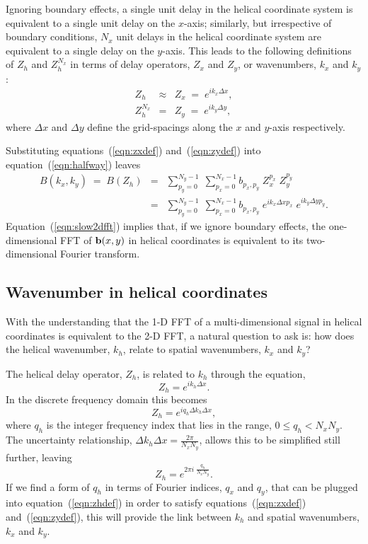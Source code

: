\par
Ignoring boundary effects, a single unit delay in the helical
coordinate system is equivalent to a single unit delay on the
$x$-axis;  
similarly, but irrespective of boundary conditions, $N_x$ unit delays
in the helical coordinate system are equivalent to a single delay on
the $y$-axis.   
This leads to the following definitions of $Z_h$ and
$Z_h^{N_x}$ in terms of delay operators, $Z_x$ and $Z_y$, or
wavenumbers, $k_x$ and $k_y$:
\begin{eqnarray}
Z_h    & \approx &  Z_x \; = \; e^{i k_x \Delta x}, 
\label{eqn:zxdef} \\ 
Z_h^{N_x} & = &  Z_y \; = \; e^{i k_y \Delta y}, \label{eqn:zydef}
\end{eqnarray}
where $\Delta x$ and $\Delta y$ define the grid-spacings along the $x$
and $y$-axis respectively.

\par
Substituting equations~(\ref{eqn:zxdef}) and~(\ref{eqn:zydef}) into
equation~(\ref{eqn:halfway}) leaves 
\begin{eqnarray}
B(k_x,k_y) \; = \; B(Z_h) 
& = & \sum_{p_y=0}^{N_y-1} \; \sum_{p_x=0}^{N_x-1}
b_{p_x,p_y} \; Z_x^{p_x} \; Z_y^{p_y} \\
& = & \sum_{p_y=0}^{N_y-1} \; \sum_{p_x=0}^{N_x-1}
b_{p_x,p_y} \; e^{i k_x \Delta x p_x} \; 
e^{i k_y \Delta y p_y}. \label{eqn:slow2dfft}
\end{eqnarray}
Equation~(\ref{eqn:slow2dfft}) implies that, if we ignore boundary 
effects, the one-dimensional FFT of ${\bf b}(x,y)$ in helical
coordinates is equivalent to its two-dimensional Fourier transform. 

\subsection{Wavenumber in helical coordinates}
With the understanding that the 1-D FFT of a multi-dimensional signal
in helical coordinates is equivalent to the 2-D FFT, a natural
question to ask is: how does the helical wavenumber, $k_h$, relate to
spatial wavenumbers, $k_x$ and $k_y$?

\par
The helical delay operator, $Z_h$, is related to $k_h$ 
through the equation,
\begin{equation}
Z_h = e^{i k_h \Delta x}.
\end{equation}
In the discrete frequency domain this becomes
\begin{equation}
Z_h = e^{i q_h \Delta k_h \Delta x},
\end{equation}
where $q_h$ is the integer frequency index that lies in the range, 
$0 \leq q_h < N_x N_y$. 
The uncertainty relationship, 
$\Delta k_h \Delta x = \frac{2 \pi}{N_x N_y}$, allows this to be
simplified still further, leaving
\begin{equation} \label{eqn:zhdef}
Z_h = e^{2 \pi i \; \frac{q_h}{N_x N_y}}.
\end{equation}
If we find a form of $q_h$ in terms of Fourier indices,
$q_x$ and $q_y$, that can be plugged into equation~(\ref{eqn:zhdef})
in order to satisfy equations~(\ref{eqn:zxdef})
and~(\ref{eqn:zydef}), this will provide the link between $k_h$ and
spatial wavenumbers, $k_x$ and $k_y$.

